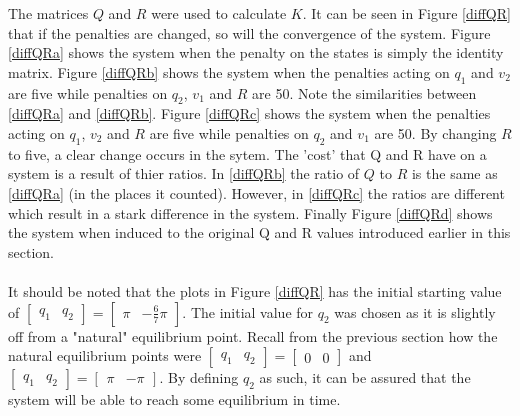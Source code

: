 \documentclass[12pt]{article}
\begin{document}
\clearpage
The matrices $Q$ and $R$ were used to calculate $K$. It can be seen in Figure \ref{diffQR} that if the penalties are changed, so will the convergence of the system. Figure \ref{diffQRa} shows the system when the penalty on the states is simply the identity matrix. Figure \ref{diffQRb} shows the system when the penalties acting on $q_{1}$ and $v_{2}$ are five while penalties on $q_{2}$, $v_{1}$ and $R$ are 50. Note the similarities between \ref{diffQRa} and \ref{diffQRb}. Figure \ref{diffQRc} shows the system when the penalties acting on $q_{1}$, $v_{2}$ and $R$ are five while penalties on $q_{2}$ and $v_{1}$ are 50. By changing $R$ to five, a clear change occurs in the sytem. The 'cost' that Q and R have on a system is a result of thier ratios. In \ref{diffQRb} the ratio of $Q$ to $R$ is the same as \ref{diffQRa} (in the places it counted). However, in \ref{diffQRc} the ratios are different which result in a stark difference in the system. Finally Figure \ref{diffQRd}  shows the system when induced to the original Q and R values introduced earlier in this section.
\\ \\
It should be noted that the plots in Figure \ref{diffQR} has the initial starting value of $\begin{bmatrix} q_{1} & q_{2} \end{bmatrix} = \begin{bmatrix} \pi & -\frac{6}{7} \pi \end{bmatrix}$. The initial value for $q_{2}$ was chosen as it is slightly off from a "natural" equilibrium point. Recall from the previous section how the natural equilibrium points were $\begin{bmatrix}q_{1} & q_{2}\end{bmatrix} = \begin{bmatrix}0 & 0\end{bmatrix}$ and $\begin{bmatrix}q_{1} & q_{2}\end{bmatrix} = \begin{bmatrix}\pi & -\pi \end{bmatrix}$. By defining $q_{2} $ as such, it can be assured that the system will be able to reach some equilibrium in time.
\end{document}
